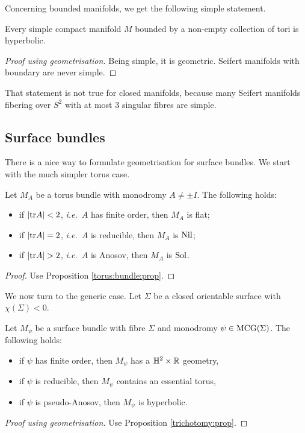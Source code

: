 Concerning bounded manifolds, we get the following simple statement.

\begin{cor} \label{simple:bounded:hyperbolic}
Every simple compact manifold $M$ bounded by a non-empty collection of tori is hyperbolic.
\end{cor}
\begin{proof}[Proof using geometrisation]
Being simple, it is geometric. Seifert manifolds with boundary are never simple.
\end{proof}

That statement is not true for closed manifolds, because many Seifert manifolds fibering over $S^2$ with at most 3 singular fibres are simple. 

\subsection{Surface bundles}
There is a nice way to formulate geometrisation for surface bundles. 
We start with the much simpler torus case.

\begin{prop}
Let $M_A$ be a torus bundle with monodromy $A \neq \pm I$. The following holds:
\end{prop}
\begin{itemize}
\item if $|{\rm tr} A|<2$, \emph{i.e.}~$A$ has finite order, then $M_A$ is flat;
\item if $|{\rm tr} A|=2$, \emph{i.e.}~$A$ is reducible, then $M_A$ is ${\rm Nil}$;
\item if $|\tr A|>2$, \emph{i.e.}~$A$ is Anosov, then $M_A$ is ${\rm Sol}$.
\end{itemize}
\begin{proof}
Use Proposition \ref{torus:bundle:prop}.
\end{proof}

We now turn to the generic case. Let $\Sigma$ be a closed orientable surface with $\chi(\Sigma)<0$.
\begin{teo} \label{fibering:geometrisation:teo}
Let $M_\psi$ be a surface bundle with fibre $\Sigma$ and monodromy $\psi \in {\rm MCG}(\Sigma)$. The following holds:
\begin{itemize}
\item if $\psi$ has finite order, then $M_\psi$ has a $\mathbb{H}^2 \times \mathbb{R}$ geometry,
\item if $\psi$ is reducible, then $M_\psi$ contains an essential torus,
\item if $\psi$ is pseudo-Anosov, then $M_\psi$ is hyperbolic.
\end{itemize}
\end{teo}
\begin{proof}[Proof using geometrisation]
Use Proposition \ref{trichotomy:prop}.
\end{proof}


